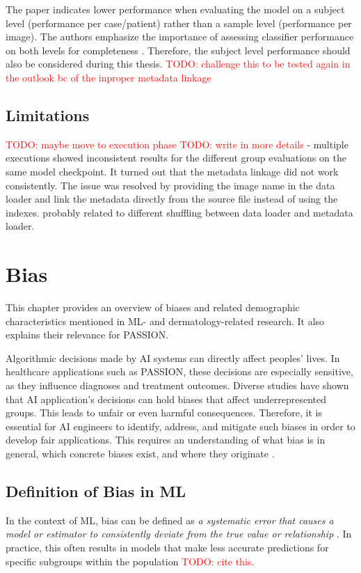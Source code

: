 \documentclass[12pt, a4paper, oneside]{book}   	%
\renewcommand{\todo}[1]{\textcolor{red}{TODO: #1}}
\begin{document}
			  The paper indicates lower performance when evaluating the model on a subject level (performance per case/patient) rather than a sample level (performance per image). The authors emphasize the importance of assessing classifier performance on both levels for completeness \autocite{Gottfrois2024}. Therefore, the subject level performance should also be considered during this thesis.
			  \todo{challenge this to be tested again in the outlook bc of the inproper metadata linkage}
	
	
		\subsection{Limitations}
				\todo{maybe move to execution phase}
				\todo{write in more details}
			   - multiple executions showed inconsistent results for the different group evaluations on the same model checkpoint. It turned out that the metadata linkage did not work consistently. The issue was resolved by providing the image name in the data loader and link the metadata directly from the source file instead of using the indexes. probably related to different shuffling between data loader and metadata loader.
		

		
		\section{Bias}
			This chapter provides an overview of biases and related demographic characteristics mentioned in \gls{ML}- and dermatology-related research. It also explains their relevance for PASSION.
			
			Algorithmic decisions made by \gls{AI} systems can directly affect peoples' lives. In healthcare applications such as PASSION, these decisions are especially sensitive, as they influence diagnoses and treatment outcomes. Diverse studies have shown that \gls{AI} application's decisions can hold biases that affect underrepresented groups. This leads to unfair or even harmful consequences. Therefore, it is essential for \gls{AI} engineers to identify, address, and mitigate such biases in order to develop fair applications. This requires an understanding of what bias is in general, which concrete biases exist, and where they originate \autocite{Mehrabi_2021}.
		
			\subsection{Definition of Bias in \gls{ML}}
		    In the context of \gls{ML}, bias can be defined as \textit{a systematic error that causes a model or estimator to consistently deviate from the true value or relationship} \autocite{Delgado-Rodriguez_2004, Taylor_2023}. In practice, this often results in models that make less accurate predictions for specific subgroups within the population \todo{cite this}.
		    			    
\end{document}
